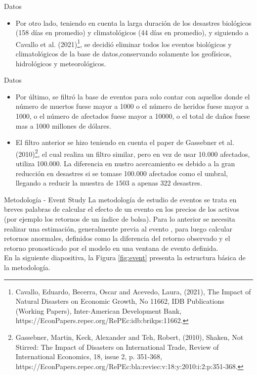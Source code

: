 \documentclass{beamer}
\begin{document}
\begin{frame}{Datos}
\begin{itemize}
    \item Por otro lado, teniendo en cuenta la larga duración de los desastres biológicos (158 días en promedio) y climatológicos (44 días en promedio), y siguiendo a Cavallo et al. (2021)\footnote{Cavallo, Eduardo, Becerra, Oscar and Acevedo, Laura, (2021), The Impact of Natural Disasters on Economic Growth, No 11662, IDB Publications (Working Papers), Inter-American Development Bank, https://EconPapers.repec.org/RePEc:idb:brikps:11662.}, se decidió eliminar todos los eventos biológicos y climatológicos de la base de datos,conservando solamente los geofísicos, hidrológicos y meteorológicos.

\end{itemize}    
\end{frame}

\begin{frame}{Datos}
\begin{itemize}
    \item Por último, se filtró la base de eventos para solo contar con aquellos donde el número de muertos fuese mayor a 1000 o el número de heridos fuese mayor a 1000, o el número de afectados fuese mayor a 10000, o el total de daños fuese mas a 1000 millones de dólares.
    \item El filtro anterior se hizo teniendo en cuenta el paper de Gassebner et al. (2010)\footnote{Gassebner, Martin, Keck, Alexander and Teh, Robert, (2010), Shaken, Not Stirred: The Impact of Disasters on International Trade, Review of International Economics, 18, issue 2, p. 351-368, https://EconPapers.repec.org/RePEc:bla:reviec:v:18:y:2010:i:2:p:351-368.}, el cual realiza un filtro similar, pero en vez de usar 10.000 afectados, utiliza 100.000. La diferencia en nustro acercamiento es debido a la gran reducción en desastres si se tomase 100.000 afectados como el umbral, llegando a reducir la muestra de $1503$ a apenas $322$ desastres.
\end{itemize}    
\end{frame}

\begin{frame}{Metodología - Event Study}
La metodología de estudio de eventos se trata en breves palabras de calcular el efecto de un evento en los precios de los activos (por ejemplo los retornos de un índice de bolsa). Para lo anterior se necesita realizar una estimación, generalmente previa al evento , para luego calcular retornos anormales, definidos como la diferencia del retorno observado y el retorno pronosticado por el modelo en una ventana de evento definida.\\
En la siguiente diapositiva, la Figura \ref{fig:event} presenta la estructura básica de la metodología.
\end{frame}
\end{document}

